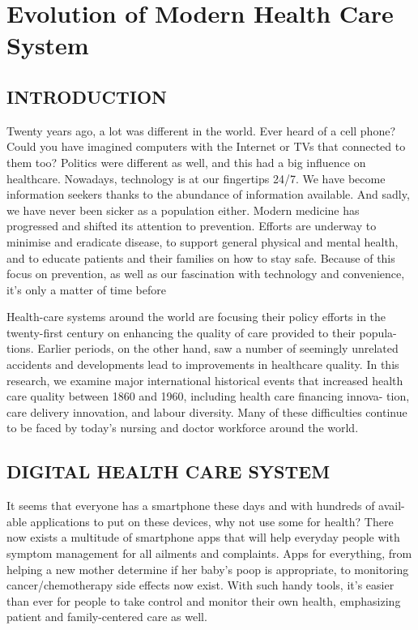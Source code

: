 \documentclass{article}
\begin{document}
\section{Evolution of Modern Health Care System}

\subsection{INTRODUCTION}
Twenty years ago, a lot was different in the world. Ever heard of a cell phone?
Could you have imagined computers with the Internet or TVs that connected
to them too? Politics were different as well, and this had a big influence on
healthcare. Nowadays, technology is at our fingertips 24/7. We have become
information seekers thanks to the abundance of information available. And
sadly, we have never been sicker as a population either.
Modern medicine has progressed and shifted its attention to prevention.
Efforts are underway to minimise and eradicate disease, to support general
physical and mental health, and to educate patients and their families on how
to stay safe. Because of this focus on prevention, as well as our fascination with
technology and convenience, it’s only a matter of time before


Health-care systems around the world are focusing their policy efforts in the
twenty-first century on enhancing the quality of care provided to their popula-
tions. Earlier periods, on the other hand, saw a number of seemingly unrelated
accidents and developments lead to improvements in healthcare quality. In this
research, we examine major international historical events that increased health
care quality between 1860 and 1960, including health care financing innova-
tion, care delivery innovation, and labour diversity. Many of these difficulties
continue to be faced by today’s nursing and doctor workforce around the world.







\subsection{DIGITAL HEALTH CARE SYSTEM}

It seems that everyone has a smartphone these days and with hundreds of avail-
able applications to put on these devices, why not use some for health? There
now exists a multitude of smartphone apps that will help everyday people with
symptom management for all ailments and complaints. Apps for everything,
from helping a new mother determine if her baby’s poop is appropriate, to
monitoring cancer/chemotherapy side effects now exist. With such handy tools,
it’s easier than ever for people to take control and monitor their own health,
emphasizing patient and family-centered care as well.
\end{document}
